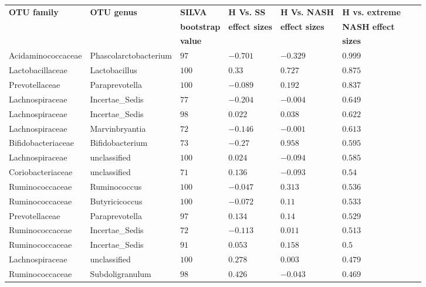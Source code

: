 \begin{table}[!ht]
\begin{tiny}
\begin{tabular}{|l|l|l|l|l|l|l|l|}
\hline
\bf{OTU family} & \bf{OTU genus} & \bf{SILVA} &\bf{H Vs. SS} & \bf{H Vs. NASH} & \bf{H vs. extreme} \\
& & \bf{bootstrap} & \bf{effect sizes} & \bf{effect sizes} & \bf{NASH effect} \\
& & \bf{value} & & & \bf{sizes}\\ \hline
Acidaminococcaceae & Phascolarctobacterium & $97$ & $-0.701$ & $-0.329$ & $0.999$ \\ \hline
Lactobacillaceae & Lactobacillus & $100$ & $0.33$ & $0.727$ & $0.875$ \\ \hline
Prevotellaceae & Paraprevotella & $100$ & $-0.089$ & $0.192$ & $0.837$ \\ \hline
Lachnospiraceae & Incertae_Sedis & $77$ & $-0.204$ & $-0.004$ & $0.649$ \\ \hline
Lachnospiraceae & Incertae_Sedis & $98$ & $0.022$ & $0.038$ & $0.622$ \\ \hline
Lachnospiraceae & Marvinbryantia & $72$ & $-0.146$ & $-0.001$ & $0.613$ \\ \hline
Bifidobacteriaceae & Bifidobacterium & $73$ & $-0.27$ & $0.958$ & $0.595$ \\ \hline
Lachnospiraceae & unclassified & $100$ & $0.024$ & $-0.094$ & $0.585$ \\ \hline
Coriobacteriaceae & unclassified & $71$ & $0.136$ & $-0.093$ & $0.54$ \\ \hline
Ruminococcaceae & Ruminococcus & $100$ & $-0.047$ & $0.313$ & $0.536$ \\ \hline
Ruminococcaceae & Butyricicoccus & $100$ & $-0.072$ & $0.11$ & $0.533$ \\ \hline
Prevotellaceae & Paraprevotella & $97$ & $0.134$ & $0.14$ & $0.529$ \\ \hline
Ruminococcaceae & Incertae_Sedis & $72$ & $-0.113$ & $0.011$ & $0.513$ \\ \hline
Ruminococcaceae & Incertae_Sedis & $91$ & $0.053$ & $0.158$ & $0.5$ \\ \hline
Lachnospiraceae & unclassified & $100$ & $0.278$ & $0.003$ & $0.479$ \\ \hline
Ruminococcaceae & Subdoligranulum & $98$ & $0.426$ & $-0.043$ & $0.469$ \\ \hline

\end{tabular}
\end{tiny}
\end{table}
